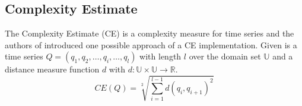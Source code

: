 \subsection{Complexity Estimate} \label{complexity_estimate}
The Complexity Estimate (CE) is a complexity measure for time series and the authors of \cite{batista2011complexity}
introduced one possible approach of a CE implementation. Given is a time series $Q = (q_1, q_2, \dots, q_i, \dots, q_l)$
with length $l$ over the domain set $\mathbb{U}$ and a distance measure function $d$ with
$d: \mathbb{U} \times \mathbb{U} \to \mathbb{R}$.
\begin{equation}
    CE(Q) = \sqrt[2]{\sum \limits_{i=1}^{l-1} d(q_i, q_{i + 1})^2}
\end{equation}
